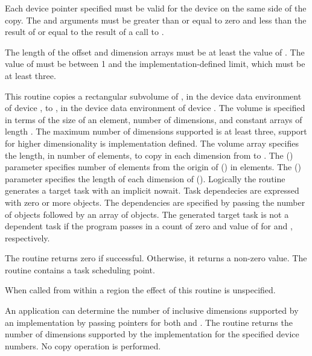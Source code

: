 \constraints
Each device pointer specified must be valid for the device on the same side
of the copy. The  and
 arguments must be greater than or equal to zero and
less than the result of  or equal to
the result of a call to .

The length of the offset and dimension arrays must be at least the
value of .
The value of  must be between 1 and the implementation-defined
limit, which must be at least three.

\effect
This routine copies a rectangular subvolume of ,
in the device data environment of device ,
to , in the device data environment of device .
The volume is specified in terms of the size of an element,
number of dimensions, and constant arrays of length .  The
maximum number of dimensions supported is at least three, support for higher
dimensionality is implementation defined. The volume array specifies the
length, in number of elements, to copy in each dimension from 
to . The  () parameter specifies
number of elements from the origin of  () in elements.
The  () parameter specifies the
length of each dimension of  ().
Logically the  routine generates a target task with an implicit nowait.
Task dependecies are expressed with zero or more 
objects. The dependencies are specified by passing the
number of  objects followed by an array of
 objects.
The generated target task is not a dependent task if the program passes in a
count of zero and value of  for  and , respectively.

The routine returns zero if successful.
Otherwise, it returns a non-zero value. The
routine contains a task scheduling point.

When called from within a  region
the effect of this routine is unspecified.

An application can determine the number of
inclusive dimensions supported by an implementation by passing  pointers for both  and .
The routine returns the number of dimensions supported
by the implementation for the specified device numbers.
No copy operation is performed.

